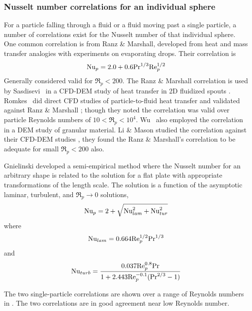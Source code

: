 \subsubsection{Nusselt number correlations for an individual sphere}
For a particle falling through a fluid or a fluid moving past a single particle, a number of correlations exist for the Nusselt number of that individual sphere. One common correlation is from Ranz \& Marshall\cite{Ranz1952}, developed from heat and mass transfer analogies with experiments on evaporating drops. Their correlation is
\begin{equation}\label{eq:ranz_marshall}
    \mathrm{Nu}_p = 2.0 + 0.6\mathrm{Pr}^{1/3}\mathrm{Re}_p^{1/2}
\end{equation}
Generally considered valid for $\Re_p< 200$. The Ranz \& Marshall correlation is used by Sasdisevi\etal~ in a CFD-DEM study of heat transfer in 2D fluidized spouts \cite{Swasdisevi2005}. Romkes\etal~ did direct CFD studies of particle-to-fluid heat transfer and validated against Ranz \& Marshall \cite{Romkes2003}; though they noted the correlation was valid over particle Reynolds numbers of $10 < \Re_p < 10^4$. Wu\etal~ also employed the correlation in a DEM study of granular material\cite{Wu2011}. Li \& Mason studied the correlation against their CFD-DEM studies \cite{Li2003a}, they found the Ranz \& Marshall's correlation to be adequate for small $\Re_p < 200$ also. 



Gnielinski\cite{gnielinski1982berechnung} developed a semi-empirical method where the Nusselt number for an arbitrary shape is related to the solution for a flat plate with appropriate transformations of the length scale. The solution is a function of the asymptotic laminar, turbulent, and $\Re_p\rightarrow 0$ solutions,
\begin{equation}\label{eq:gnielinski}
    \mathrm{Nu}_p = 2 + \sqrt{\mathrm{Nu}^2_{lam} + \mathrm{Nu}^2_{tur}}
\end{equation}
where
\begin{equation}
    \mathrm{Nu}_{lam} = 0.664\mathrm{Re}_p^{1/2}\mathrm{Pr}^{1/3}
\end{equation}
and
\begin{equation}
    \mathrm{Nu}_{turb} = \frac{0.037 \mathrm{Re}_p^{0.8}\mathrm{Pr}}{1 + 2.443\mathrm{Re}_p^{-0.1}(\mathrm{Pr}^{2/3}-1)}
\end{equation}


The two single-particle correlations are shown over a range of Reynolds numbers in . The two correlations are in good agreement near low Reynolds number.

